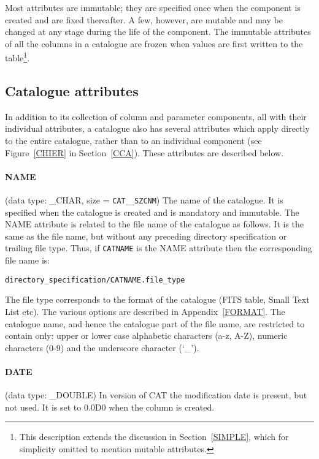 Most attributes are immutable; they are specified once when the
component is created and are fixed thereafter. A few, however, are
mutable and may be changed at any stage during the life of the
component. The immutable attributes of all the columns in a catalogue
are frozen when values are first written to the table\footnote{This
description extends the discussion in Section~\ref{SIMPLE}, which for
simplicity omitted to mention mutable attributes.}.

\subsection{Catalogue attributes}

In addition to its collection of column and parameter
components,
all with their individual attributes, a catalogue also has several
attributes which apply directly to the entire catalogue, rather than to
an individual component (see Figure~\ref{CHIER} in Section~\ref{CCA}).
These attributes are described below.

\paragraph{NAME}
(data type: \_CHAR, size = {\tt CAT\_\_SZCNM}) The name of the
catalogue. It is specified when the catalogue is created and is
mandatory and immutable. The NAME attribute is related to the file name
of the catalogue as follows. It is the same as the file name, but
without any preceding directory specification or trailing file type.
Thus, if {\tt CATNAME} is the NAME attribute then the corresponding
file name is:

\begin{center}
{\tt directory\_specification/CATNAME.file\_type}
\end{center}

The file type corresponds to the format of the catalogue (FITS table,
Small Text List etc). The various options are described in
Appendix~\ref{FORMAT}.  The catalogue name, and hence the catalogue part
of the file name, are restricted to contain only: upper or lower case
alphabetic characters (a-z, A-Z), numeric characters (0-9) and the
underscore character (`\_').

\paragraph{DATE}
(data type: \_DOUBLE)
In version \CATversion of CAT the modification date is present, but
not used. It is set to 0.0D0 when the column is created.

